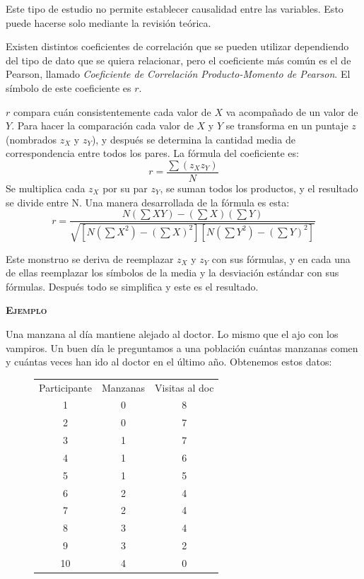 \documentclass[a4paper,12pt]{article}
\begin{document}
Este tipo de estudio no permite establecer causalidad entre las variables. Esto puede hacerse solo mediante la revisión teórica.

Existen distintos coeficientes de correlación que se pueden utilizar dependiendo del tipo de dato que se quiera relacionar, pero el coeficiente más común es el de Pearson, llamado {\slshape Coeficiente de Correlación Producto-Momento de Pearson}. El símbolo de este coeficiente es $r$.

$r$ compara cuán consistentemente cada valor de $X$ va acompañado de un valor de $Y$. Para hacer la comparación cada valor de $X$ y $Y$ se transforma en un puntaje $z$ (nombrados $z_X$ y $z_Y$), y después se determina la cantidad media de correspondencia entre todos los pares. La fórmula del coeficiente es:
\[
  r = \frac{
    \sum(z_X z_Y)
  }{
    N
  }
\]
Se multiplica cada $z_X$ por su par $z_Y$, se suman todos los productos, y el resultado se divide entre N. Una manera desarrollada de la fórmula es esta:
\[
  r = \frac{
    N(\sum XY) - (\sum X)(\sum Y)
  }{
    \sqrt{\left[N\left(\sum X^{2}\right) - \left(\sum X\right)^{2}\right] \left[N\left(\sum Y^{2}\right) - \left(\sum Y\right)^{2}\right]}
  }
\]

Este monstruo se deriva de reemplazar $z_X$ y $z_Y$ con sus fórmulas, y en cada una de ellas reemplazar los símbolos de la media y la desviación estándar con sus fórmulas. Después todo se simplifica y este es el resultado.

{\noindent\scshape\bfseries Ejemplo}

Una manzana al día mantiene alejado al doctor. Lo mismo que el ajo con los vampiros. Un buen día le preguntamos a una población cuántas manzanas comen y cuántas veces han ido al doctor en el último año. Obtenemos estos datos:
\begin{figure}[!ht]
  \begin{center}
    \begin{tabular}{c|c|c}
      Participante&Manzanas&Visitas al doc\\
      1&0&8\\
      2&0&7\\
      3&1&7\\
      4&1&6\\
      5&1&5\\
      6&2&4\\
      7&2&4\\
      8&3&4\\
      9&3&2\\
      10&4&0
    \end{tabular}
  \end{center}
\end{figure}
\end{document}
